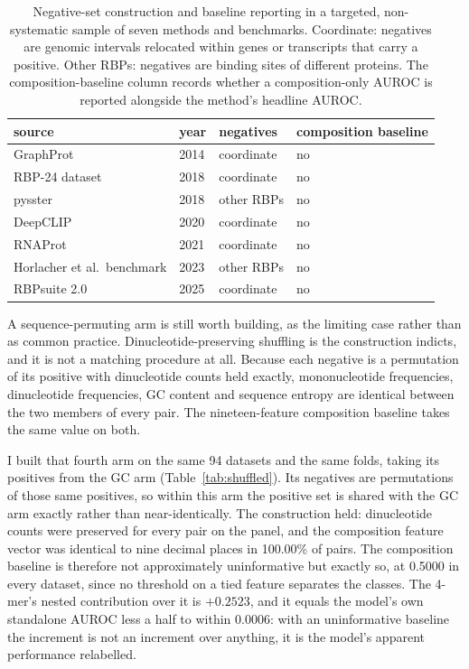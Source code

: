 \begin{table}[htbp]
\centering
\caption{Negative-set construction and baseline reporting in a targeted, non-systematic
sample of seven methods and benchmarks. Coordinate: negatives are genomic intervals relocated within genes or transcripts
that carry a positive. Other RBPs: negatives are binding sites of different proteins. The
composition-baseline column records whether a composition-only AUROC is reported alongside the
method's headline AUROC.}
\label{tab:survey}
\begin{tabular}{llll}
\toprule
source & year & negatives & composition baseline \\
\midrule
GraphProt \citep{maticzka2014} & 2014 & coordinate & no \\
RBP-24 dataset \citep{pan2018} & 2018 & coordinate & no \\
pysster \citep{budach2018} & 2018 & other RBPs & no \\
DeepCLIP \citep{gronning2020} & 2020 & coordinate & no \\
RNAProt \citep{uhl2021} & 2021 & coordinate & no \\
Horlacher et al.\ benchmark \citep{horlacher2023} & 2023 & other RBPs & no \\
RBPsuite 2.0 \citep{pan2025} & 2025 & coordinate & no \\
\bottomrule
\end{tabular}
\end{table}

A sequence-permuting arm is still worth building, as the limiting case rather than as common
practice. Dinucleotide-preserving shuffling is the construction \citet{tourne2026} indicts, and
it is not a matching procedure at all. Because
each negative is a permutation of its positive with dinucleotide counts held exactly,
mononucleotide frequencies, dinucleotide frequencies, GC content and sequence entropy are
identical between the two members of every pair. The nineteen-feature composition baseline takes
the same value on both.

I built that fourth arm on the same 94 datasets and the same folds, taking its positives from
the GC arm (Table~\ref{tab:shuffled}). Its negatives are permutations of those same positives,
so within this arm the positive set is shared with the GC arm exactly rather than
near-identically. The construction held: dinucleotide counts were preserved for every
pair on the panel, and the composition feature vector was identical to nine decimal places in
100.00\% of pairs. The composition baseline is therefore not approximately uninformative but
exactly so, at 0.5000 in every dataset, since no threshold on a tied feature separates the
classes. The 4-mer's nested contribution over it is $+0.2523$, and it equals the model's own
standalone AUROC less a half to within $0.0006$: with an uninformative baseline the increment
is not an increment over anything, it is the model's apparent performance relabelled.

